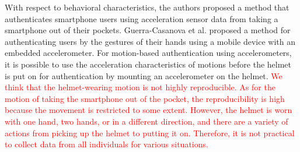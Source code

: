\documentclass[english,preprint,JIP]{ipsj}
\begin{document}
With respect to behavioral characteristics, the authors proposed a method that authenticates smartphone users using acceleration sensor data from taking a smartphone out of their pockets\cite{murao_screen_unlock_blind}. Guerra-Casanova et al.\cite{accelerometer_authentification} proposed a method for authenticating users by the gestures of their hands using a mobile device with an embedded accelerometer. For motion-based authentication using accelerometers, it is possible to use the acceleration characteristics of motions before the helmet is put on for authentication by mounting an accelerometer on the helmet. \textcolor{red}{We think that the helmet-wearing motion is not highly reproducible. As for the motion of taking the smartphone out of the pocket, the reproducibility is high because the movement is restricted to some extent. However, the helmet is worn with one hand, two hands, or in a different direction, and there are a variety of actions from picking up the helmet to putting it on. Therefore, it is not practical to collect data from all individuals for various situations.}



\end{document}
